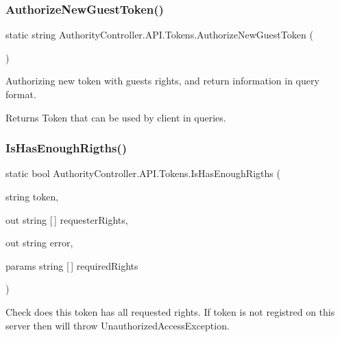 \subsubsection{\texorpdfstring{Authorize\+New\+Guest\+Token()}{AuthorizeNewGuestToken()}\hspace{0.1cm}{\footnotesize\ttfamily [2/2]}}
{\footnotesize\ttfamily static string Authority\+Controller.\+A\+P\+I.\+Tokens.\+Authorize\+New\+Guest\+Token (\begin{DoxyParamCaption}{ }\end{DoxyParamCaption})\hspace{0.3cm}{\ttfamily [static]}}



Authorizing new token with guest\textquotesingle{}s rights, and return information in query format. 

\begin{DoxyReturn}{Returns}
Token that can be used by client in queries.
\end{DoxyReturn}
\mbox{\label{class_authority_controller_1_1_a_p_i_1_1_tokens_a3077a786044bdd530ad50dbd615f8beb}} 
\subsubsection{\texorpdfstring{Is\+Has\+Enough\+Rigths()}{IsHasEnoughRigths()}\hspace{0.1cm}{\footnotesize\ttfamily [1/2]}}
{\footnotesize\ttfamily static bool Authority\+Controller.\+A\+P\+I.\+Tokens.\+Is\+Has\+Enough\+Rigths (\begin{DoxyParamCaption}\item[{string}]{token,  }\item[{out string \mbox{[}$\,$\mbox{]}}]{requester\+Rights,  }\item[{out string}]{error,  }\item[{params string \mbox{[}$\,$\mbox{]}}]{required\+Rights }\end{DoxyParamCaption})\hspace{0.3cm}{\ttfamily [static]}}



Check does this token has all requested rights. If token is not registred on this server then will throw Unauthorized\+Access\+Exception. 


